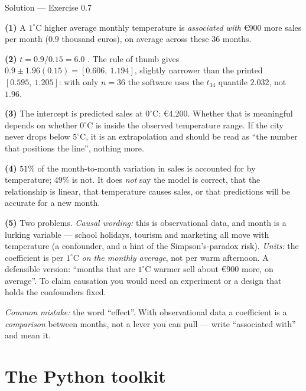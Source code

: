 \documentclass[aspectratio=169,11pt]{beamer}
\begin{document}
\begin{frame}{Solution --- Exercise 0.7}
  \begin{solutionbox}
    \scriptsize
    \textbf{(1)} A $1^\circ$C higher average monthly temperature is
    \emph{associated with} \euro 900 more sales per month
    ($0.9$ thousand euros), on average across these 36 months.

    \textbf{(2)} $t = 0.9/0.15 = 6.0$ \checkmark. The rule of thumb gives
    $0.9 \pm 1.96(0.15) = [0.606,\ 1.194]$, slightly narrower than the printed
    $[0.595,\ 1.205]$: with only $n = 36$ the software uses the $t_{34}$
    quantile $2.032$, not $1.96$.

    \textbf{(3)} The intercept is predicted sales at $0^\circ$C:
    \euro 4{,}200. Whether that is meaningful depends on whether $0^\circ$C
    is inside the observed temperature range. If the city never drops below
    $5^\circ$C, it is an extrapolation and should be read as ``the number
    that positions the line'', nothing more.

    \textbf{(4)} $51\%$ of the month-to-month variation in sales is accounted
    for by temperature; $49\%$ is not. It does \emph{not} say the model is
    correct, that the relationship is linear, that temperature causes sales,
    or that predictions will be accurate for a new month.

    \textbf{(5)} Two problems. \emph{Causal wording:} this is observational
    data, and month is a lurking variable --- school holidays, tourism and
    marketing all move with temperature (a confounder, and a hint of the
    Simpson's-paradox risk). \emph{Units:} the coefficient is per
    $1^\circ$C \emph{on the monthly average}, not per warm afternoon.
    A defensible version: ``months that are $1^\circ$C warmer sell about
    \euro 900 more, on average''. To claim causation you would need an
    experiment or a design that holds the confounders fixed.

    \smallskip
    \textit{Common mistake:} the word ``effect''. With observational data a
    coefficient is a \emph{comparison} between months, not a lever you can
    pull --- write ``associated with'' and mean it.
  \end{solutionbox}
\end{frame}


\section[Python]{The Python toolkit}
\end{document}

